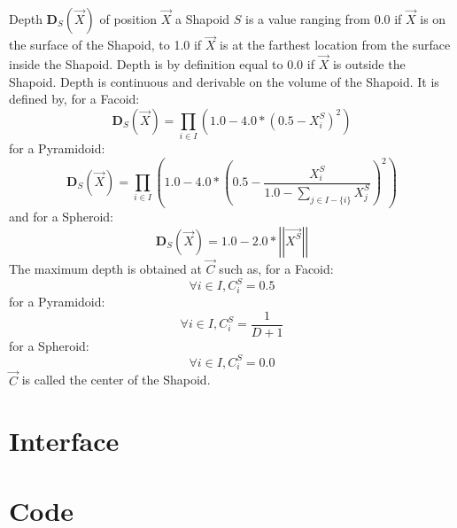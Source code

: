 Depth $\mathbf{D}_S(\overrightarrow{X})$ of position $\overrightarrow{X}$ a Shapoid $S$ is a value ranging from 0.0 if $\overrightarrow{X}$ is on the surface of the Shapoid, to 1.0 if $\overrightarrow{X}$ is at the farthest location from the surface inside the Shapoid. Depth is by definition equal to 0.0 if $\overrightarrow{X}$ is outside the Shapoid. Depth is continuous and derivable on the volume of the Shapoid. It is defined by, for a Facoid:\\
\begin{equation}
\mathbf{D}_S(\overrightarrow{X})=\prod_{i\in I}\left(1.0-4.0*(0.5-X^S_i)^2\right)
\end{equation}
for a Pyramidoid:\\
\begin{equation}
\mathbf{D}_S(\overrightarrow{X})=\prod_{i\in I}\left(1.0-4.0*\left(0.5-\frac{X^S_i}{1.0-\sum_{j\in I-\lbrace i\rbrace}X^S_j}\right)^2\right)
\end{equation}
and for a Spheroid:\\
\begin{equation}
\mathbf{D}_S(\overrightarrow{X})=1.0-2.0*\left|\left|\overrightarrow{X^S}\right|\right|
\end{equation}
The maximum depth is obtained at $\overrightarrow{C}$ such as, for a Facoid:\\
\begin{equation}
\forall i\in I,C_i^S=0.5
\end{equation}
for a Pyramidoid:\\
\begin{equation}
\forall i\in I,C_i^S=\frac{1}{D+1}
\end{equation}
for a Spheroid:\\
\begin{equation}
\forall i\in I,C_i^S=0.0
\end{equation}
$\overrightarrow{C}$ is called the center of the Shapoid.

\section{Interface}

\begin{scriptsize}
\begin{ttfamily}

\end{ttfamily}
\end{scriptsize}

\section{Code}

